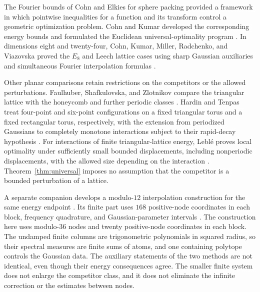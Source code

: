 \documentclass[11pt]{article}
\theoremstyle{remark}\newtheorem{remark}[theorem]{Remark}
\begin{document}
The Fourier bounds of Cohn and Elkies for sphere packing
\cite{CohnElkies2003} provided a framework in which pointwise inequalities
for a function and its transform control a geometric optimization problem.
Cohn and Kumar developed the corresponding energy bounds and formulated
the Euclidean universal-optimality program
\cite[Proposition~9.3 and Conjecture~9.4]{CohnKumar2007}.
In dimensions eight and twenty-four, Cohn, Kumar, Miller, Radchenko, and
Viazovska proved the $E_8$ and Leech lattice cases using sharp Gaussian
auxiliaries and simultaneous Fourier interpolation formulas
\cite[Theorems~1.4, 1.7, and~1.9]{CKMRV2022}.

Other planar comparisons retain restrictions on the competitors or the
allowed perturbations. Faulhuber, Shafkulovska, and Zlotnikov compare the
triangular lattice with the honeycomb and further periodic classes
\cite[Theorems~1.1--1.2 and Corollary~1.3]{FaulhuberShafkulovskaZlotnikov2023}.
Hardin and Tenpas treat four-point and six-point configurations on a fixed
triangular torus and a fixed rectangular torus, respectively, with the
extension from periodized Gaussians to completely monotone interactions
subject to their rapid-decay hypothesis
\cite[Theorem~1]{HardinTenpas2025}. For interactions of finite
triangular-lattice energy, Lebl\'e proves local optimality under sufficiently
small bounded displacements, including nonperiodic displacements, with
the allowed size depending on the interaction
\cite[Theorems~1--2 and Remark~1.1]{Leble2025}. Theorem~\ref{thm:universal} imposes no
assumption that the competitor is a bounded perturbation of a lattice.

A separate companion develops a modulo-$12$ interpolation construction for
the same energy endpoint \cite{UniversalTriangular2026}. Its finite part
uses $168$ positive-node coordinates in each block, frequency quadrature,
and Gaussian-parameter intervals
\cite[Section~3, especially Proposition~3.3]{UniversalTriangular2026}.
The construction here uses
modulo-$36$ nodes and twenty positive-node coordinates in each block.
The undamped finite columns are trigonometric polynomials in squared radius,
so their spectral measures are finite sums of atoms, and one containing
polytope controls the Gaussian data. The auxiliary statements of the two
methods are not identical, even though their energy consequences agree.
The smaller finite system does not enlarge the competitor class, and it
does not eliminate the infinite correction or the estimates between nodes.
\end{document}
